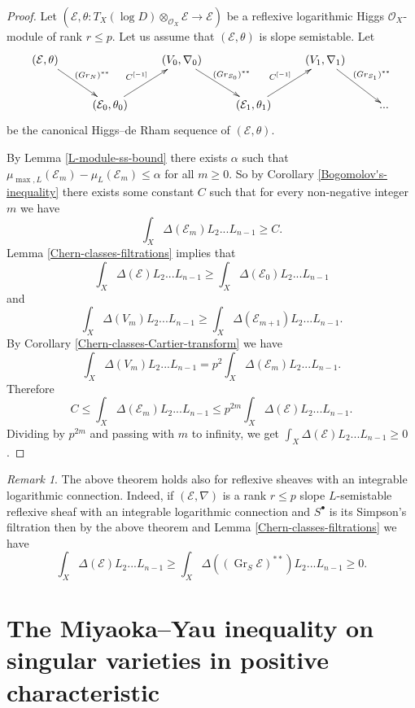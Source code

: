 \documentclass[12pt]{article}
\theoremstyle{plain}
\theoremstyle{definition}
\theoremstyle{remark}
\newtheorem{Remark}[Thm]{Remark}
\newcommand{\cE}{{\mathcal E}}
\newcommand{\cO}{{\mathcal O}}
\newcommand{\Gr}{{\mathop{Gr}}}
\begin{document}
\begin{proof}
Let $(\cE, \theta : T_X (\log D)\otimes _{\cO_X}\cE\to \cE)$ be a  reflexive logarithmic Higgs
 $\cO_X$-module of rank $r\le p$. Let us assume that $(\cE, \theta)$ is slope semistable. 
Let 
$${  \xymatrix{
		(\cE, \theta) \ar[rd]^{(\Gr _{N})^{**}}	&& (V_0, \nabla _0)\ar[rd]^{(\Gr _{S_0})^{**}}&& (V_1, \nabla _1)\ar[rd]^{(\Gr _{S_1})^{**}}&\\
		&	(\cE_0, \theta _0)\ar[ru]^{C^{[-1]}}&&	(\cE_1, \theta_1)\ar[ru]^{C^{[-1]}}&&...\\
}}$$
be  the {canonical Higgs--de Rham sequence} of $(\cE, \theta)$.

By Lemma \ref{L-module-ss-bound}  there exists $\alpha$ such that $\mu _{\max ,L } (\cE _m)-\mu _L (\cE _m)\le \alpha$  for all $m\ge 0$. So by Corollary \ref{Bogomolov's-inequality} there exists some 
constant $C$ such that for every non-negative integer $m$ we have
$$\int _X \Delta (\cE _m) L_2...L_{n-1}\ge C.$$
Lemma \ref{Chern-classes-filtrations} implies that
$$\int _X \Delta (\cE) L_2...L_{n-1} \ge \int _X \Delta (\cE _{0})L_2...L_{n-1}$$
and
$$\int _X \Delta (V_m) L_2...L_{n-1} \ge \int _X \Delta (\cE _{m+1})L_2...L_{n-1}.$$
By Corollary \ref{Chern-classes-Cartier-transform} we have
$$\int _X \Delta (V_m) L_2...L_{n-1}=p^2\int _X \Delta (\cE_m) L_2...L_{n-1}.$$
Therefore 
$$C\le \int _X \Delta (\cE _m) L_2...L_{n-1}\le p^{2m}\int _X \Delta (\cE)L_2...L_{n-1}.$$
Dividing by $p^{2m}$ and passing with $m$ to infinity, we get $\int _X \Delta (\cE) L_2...L_{n-1}\ge 0$.
\end{proof}

\begin{Remark} \label{Bogomolov-inequality-for-connections}
The above theorem holds also for reflexive sheaves with an integrable logarithmic connection.
Indeed, if $(\cE, \nabla)$ is a rank $r\le p$ slope $L$-semistable reflexive sheaf with an integrable 
logarithmic connection and $S^{\bullet}$ is its  Simpson's filtration then 
by the above theorem and Lemma \ref{Chern-classes-filtrations} we have
$$\int_X\Delta (\cE)L_2...L_{n-1}\ge \int_X \Delta ((\Gr _S \cE)^{**})L_2...L_{n-1}\ge 0.$$
\end{Remark}



\section{The Miyaoka--Yau inequality on singular varieties in positive characteristic}\label{Section:Miyaoka-Yau}
\end{document}
